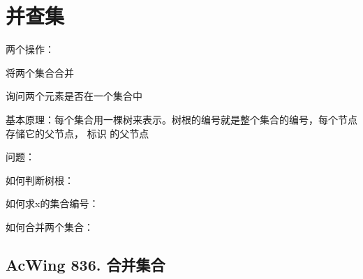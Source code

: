 \section{并查集}

两个操作：

\begin{myenum}
    \item 将两个集合合并
    \item 询问两个元素是否在一个集合中
\end{myenum}

基本原理：每个集合用一棵树来表示。树根的编号就是整个集合的编号，每个节点存储它的父节点，  标识  的父节点

问题：

\begin{myenum}
    \item 如何判断树根： 
    \item 如何求x的集合编号： 
    \item 如何合并两个集合： 
\end{myenum}

\subsection{AcWing 836. 合并集合}

